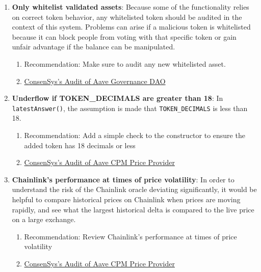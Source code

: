 \begin{enumerate}
\item\textbf{Only whitelist validated assets}: Because some of the functionality relies on correct token behavior, any whitelisted token should be audited in the context of this system. Problems can arise if a malicious token is whitelisted because it can block people from voting with that specific token or gain unfair advantage if the balance can be manipulated.
	\begin{enumerate}
	\item Recommendation: Make sure to audit any new whitelisted asset.
	\item\href{https://consensys.net/diligence/audits/2020/08/aave-governance-dao/\#only-whitelist-validated-assets}{ConsenSys's Audit of Aave Governance DAO}
	\end{enumerate}

\item\textbf{Underflow if TOKEN\_DECIMALS are greater than 18}: In \verb|latestAnswer()|, the assumption is made that \verb|TOKEN_DECIMALS| is less than 18.
	\begin{enumerate}
	\item Recommendation: Add a simple check to the constructor to ensure the added token has 18 decimals or less
	\item\href{https://consensys.net/diligence/audits/2020/05/aave-cpm-price-provider/\#underflow-if-token-decimals-are-greater-than-18}{ConsenSys's Audit of Aave CPM Price Provider}
	\end{enumerate}

\item\textbf{Chainlink’s performance at times of price volatility}: In order to understand the risk of the Chainlink oracle deviating significantly, it would be helpful to compare historical prices on Chainlink when prices are moving rapidly, and see what the largest historical delta is compared to the live price on a large exchange.
	\begin{enumerate}
	\item Recommendation: Review Chainlink’s performance at times of price volatility
	\item\href{https://consensys.net/diligence/audits/2020/05/aave-cpm-price-provider/\#review-chainlink-s-performance-at-times-of-price-volatility}{ConsenSys's Audit of Aave CPM Price Provider}
	\end{enumerate}


\end{enumerate}
